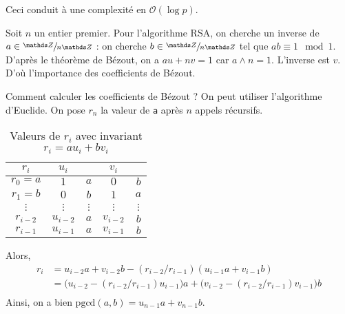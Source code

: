 {{		Ceci conduit à une complexité en $\mathcal{O}(\log p)$.
	
		\bigskip
	
		Soit $n$ un entier premier.
		Pour l'algorithme RSA, on cherche un inverse de $a \in \sfrac{\Z}{n\Z}$ : on cherche $b \in \sfrac\Z{n\Z}$ tel que $ab \equiv 1 \mod 1$. D'après le théorème de Bézout, on a $au + nv = 1$ car $a \wedge n = 1$. L'inverse est $v$. D'où l'importance des coefficients de Bézout.
	
		Comment calculer les coefficients de Bézout ?
		On peut utiliser l'algorithme d'Euclide.
		On pose $r_n$\/ la valeur de \texttt{a} après $n$ appels récursifs.
	
		\begin{table}[H]
			\centering
			\begin{tabular}{c|c|c|c|c}
				$r_i$ & $u_i$ & & $v_i$ &\\ \hline \hline
				$r_0 = a$ & $1$ & $a$ & $0$ & $b$\\
				$r_1 = b$ & $0$ & $b$ & $1$ & $a$\\
				$\vdots$ & $\vdots$ & $\vdots$ & $\vdots$ & $\vdots$ \\
				$r_{i-2}$ & $u_{i-2}$ & $a$ & $v_{i-2}$ & $b$\\
				$r_{i-1}$ & $u_{i-1}$ & $a$ & $v_{i-1}$ & $b$ \\
			\end{tabular}
			\caption{Valeurs de $r_i$ avec invariant $r_i = a u_i + b v_i$}
		\end{table}
	
		Alors,
		\begin{align*}
			r_i &= u_{i-2} a + v_{i-2} b - (r_{i-2} / r_{i-1}) (u_{i-1}a + v_{i-1} b)\\
			&= \big(u_{i-2} - (r_{i-2}/r_{i-1}) u_{i-1}\big) a + \big(v_{i-2} - (r_{i-2}/r_{i-1}) v_{i-1}\big) b \\
		\end{align*}
		Ainsi, on a bien $\mathrm{pgcd}(a,b) = u_{n-1} a + v_{n-1} b$.
	}
	\def\addmacros#1{#1}
}
